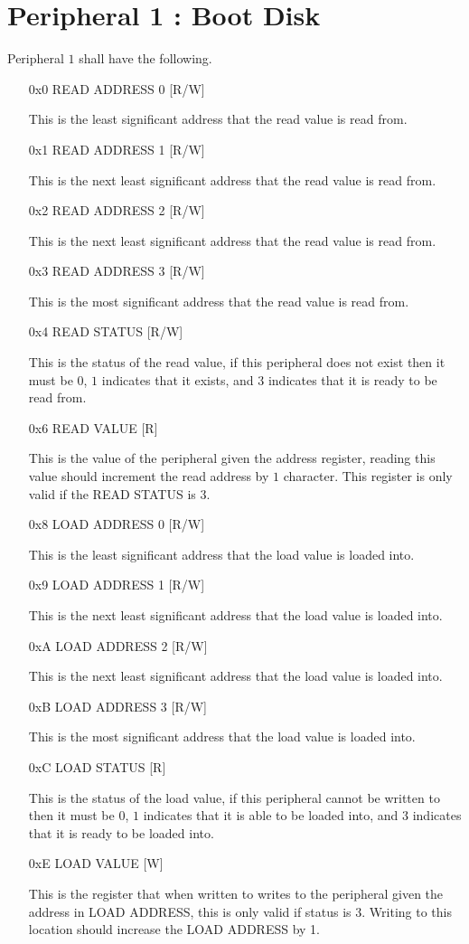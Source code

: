 \documentclass[12pt,letterpaper]{report}
\newcommand{\ronly}{[R]}
\newcommand{\wonly}{[W]}
\newcommand{\rw}{[R/W]}
\begin{document}
\section{Peripheral 1 : Boot Disk}
\label{peripheral:Boot Disk}
Peripheral $1$ shall have the following.
\begin{enumerate}
\item[0x0] READ ADDRESS 0 \rw

This is the least significant address that the read value is read from.
\item[0x1] READ ADDRESS 1 \rw

This is the next least significant address that the read value is read from.
\item[0x2] READ ADDRESS 2 \rw

This is the next least significant address that the read value is read from.
\item[0x3] READ ADDRESS 3 \rw

This is the most significant address that the read value is read from.
\item[0x4] READ STATUS \rw

This is the status of the read value, if this peripheral does not exist then it must be $0$, $1$ indicates that it exists, and $3$ indicates that it is ready to be read from.
\item[0x6] READ VALUE \ronly

This is the value of the peripheral given the address register, reading this value should increment the read address by $1$ character. This register is only valid if the READ STATUS is $3$.
\item[0x8] LOAD ADDRESS 0 \rw

This is the least significant address that the load value is loaded into.
\item[0x9] LOAD ADDRESS 1 \rw

This is the next least significant address that the load value is loaded into.
\item[0xA] LOAD ADDRESS 2 \rw

This is the next least significant address that the load value is loaded into.
\item[0xB] LOAD ADDRESS 3 \rw

This is the most significant address that the load value is loaded into.
\item[0xC] LOAD STATUS \ronly

This is the status of the load value, if this peripheral cannot be written to then it must be $0$, $1$ indicates that it is able to be loaded into, and $3$ indicates that it is ready to be loaded into.
\item[0xE] LOAD VALUE \wonly

This is the register that when written to writes to the peripheral given the address in LOAD ADDRESS, this is only valid if status is $3$. Writing to this location should increase the LOAD ADDRESS by 1.
\end{enumerate}
\end{document}
